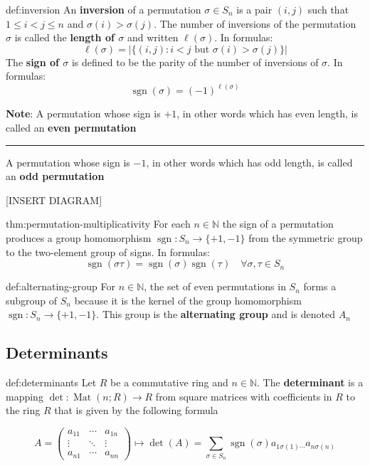 \documentclass{article}
\DeclareMathOperator{\sgn}{sgn}
\DeclareMathOperator{\Mat}{Mat}
\begin{document}
\begin{dfn}{def:inversion}{}
    An \textbf{inversion} of a permutation $\sigma\in S_{n}$ is a pair $(i, j)$ such that $1 \le i < j \le n$ and $\sigma(i) > \sigma(j)$. The number of inversions of the permutation $\sigma$ is called the \textbf{length of $\sigma$} and written $\ell(\sigma)$. In formulas:
    \[\ell(\sigma) = \lvert \{(i,j) : i < j \text{ but } \sigma(i) > \sigma(j)\} \rvert\]
    The \textbf{sign of $\sigma$} is defined to be the parity of the number of inversions of $\sigma$. In formulas:
    \[\sgn(\sigma) = (-1)^{\ell(\sigma)}\]
\end{dfn}

\textbf{Note}: A permutation whose sign is $+1$, in other words which has even length, is called an \textbf{even permutation}

\noindent\rule{\textwidth}{0.2pt}

A permutation whose sign is $-1$, in other words which has odd length, is called an \textbf{odd permutation}

[INSERT DIAGRAM]

\begin{thm}{thm:permutation-multiplicativity}{}
    For each $n\in \mathbb{N}$ the sign of a permutation produces a group homomorphism $\sgn : S_{n} \to \{+1, -1\}$ from the symmetric group to the two-element group of signs. In formulas:
    \[\sgn(\sigma\tau) = \sgn(\sigma)\sgn(\tau) \quad \forall \sigma, \tau\in S_{n}\]
\end{thm}

\begin{dfn}{def:alternating-group}{}
    For $n\in \mathbb{N}$, the set of even permutations in $S_{n}$ forms a subgroup of $S_{n}$ because it is the kernel of the group homomorphism $\sgn : S_{n}\to \{+1, -1\}$. This group is the \textbf{alternating group} and is denoted $A_{n}$
\end{dfn}

\newpage

\subsection{Determinants}

\begin{dfn}[Determinants]{def:determinants}{}
    Let $R$ be a commutative ring and $n\in \mathbb{N}$. The \textbf{determinant} is a mapping $\det : \Mat(n;R) \to R$ from square matrices with coefficients in $R$ to the ring $R$ that is given by the following formula

    \[A = \begin{pmatrix}
        a_{11} & \cdots & a_{1n}\\
        \vdots & \ddots & \vdots\\
        a_{n1} & \cdots & a_{nn}
    \end{pmatrix} \mapsto \det(A) = \sum_{\sigma\in S_{n}} \sgn(\sigma) a_{1\sigma(1)\cdots}  a_{n\sigma(n)}\]
\end{dfn}
\end{document}
